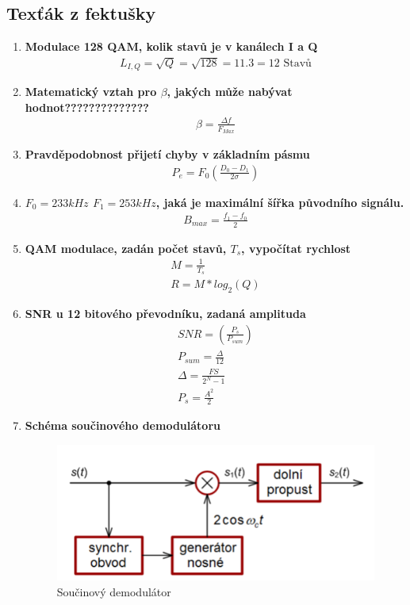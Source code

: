 \subsection{Texťák z fektušky}
\begin{enumerate}
    \item \textbf{Modulace 128 QAM, kolik stavů je v kanálech I a Q}
    \begin{gather*}
        L_{I,Q}=\sqrt{Q}=\sqrt{128}=11.3= 12\textrm{ Stavů}
    \end{gather*}

    \item \textbf{Matematický vztah pro $\beta$, jakých může nabývat hodnot?????????????? }
    \begin{gather*}
        \beta=\frac{\Delta f}{F_{Max}}
    \end{gather*}
    \item \textbf{Pravděpodobnost přijetí chyby v základním pásmu}
    \begin{gather*}
        P_e=F_0(\frac{D_0-D_1}{2\sigma})
    \end{gather*}
    \item \textbf{$F_0=233kHz$ $F_1=253 kHz$, jaká je maximální šířka původního signálu.}
    \begin{gather*}
        B_{max}=\frac{f_1-f_0}{2}
    \end{gather*}
    
    \item \textbf{QAM modulace, zadán počet stavů, $T_s$, vypočítat rychlost}
    \begin{gather*}
        M=\frac{1}{T_s} \\
        R=M*log_2(Q) 
    \end{gather*}
    \item \textbf{SNR u 12 bitového převodníku, zadaná amplituda}
    \begin{gather*}
        SNR=(\frac{P_s}{P_{sum}})\\
        P_{sum}=\frac{\Delta}{12}\\
        \Delta=\frac{FS}{2^N-1}\\
        P_s=\frac{A^2}{2}
    \end{gather*}
    \item \textbf{Schéma součinového demodulátoru}
    \begin{figure}[h!]
        \centering
        \includegraphics[width=0.5\linewidth]{images/soucindemod.png}
        \caption{Součinový demodulátor}
        \label{fig:enter-label}
    \end{figure}


\end{enumerate}
